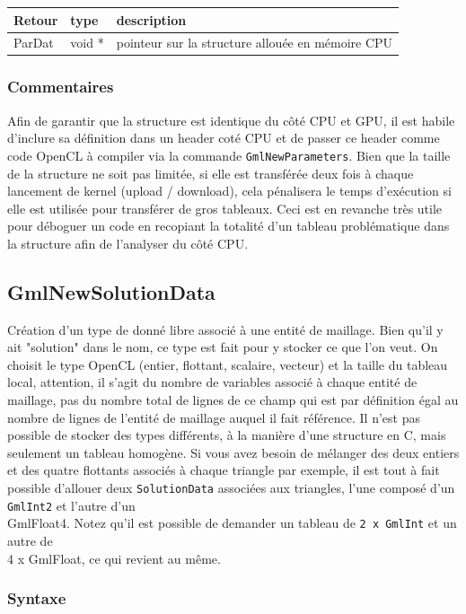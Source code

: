 \documentclass[a4paper,12pt]{article}
\begin{document}
\begin{tabular}{|m{2cm}|m{1.5cm}|m{10.5cm}|}
\hline
Retour     & type   & description \\
\hline
ParDat     & void * & pointeur sur la structure allouée en mémoire CPU \\
\hline
\end{tabular}

\subsubsection*{Commentaires}
Afin de garantir que la structure est identique du côté CPU et GPU, il est habile d'inclure sa définition dans un header coté CPU et de passer ce header comme code OpenCL à compiler via la commande {\tt GmlNewParameters}.
Bien que la taille de la structure ne soit pas limitée, si elle est transférée deux fois à chaque lancement de kernel (upload / download), cela pénalisera le temps d'exécution si elle est utilisée pour transférer de gros tableaux.
Ceci est en revanche très utile pour déboguer un code en recopiant la totalité d'un tableau problématique dans la structure afin de l'analyser du côté CPU.


\subsection{GmlNewSolutionData}

Création d'un type de donné libre associé à une entité de maillage.
Bien qu'il y ait "solution" dans le nom, ce type est fait pour y stocker ce que l'on veut.
On choisit le type OpenCL (entier, flottant, scalaire, vecteur) et la taille du tableau local, attention, il s'agit du nombre de variables associé à chaque entité de maillage, pas du nombre total de lignes de ce champ qui est par définition égal au nombre de lignes de l'entité de maillage auquel il fait référence.
Il n'est pas possible de stocker des types différents, à la manière d'une structure en C, mais seulement un tableau homogène. Si vous avez besoin de mélanger des deux entiers et des quatre flottants associés à chaque triangle par exemple, il est tout à fait possible d'allouer deux {\tt SolutionData} associées aux triangles, l'une composé d'un {\tt GmlInt2} et l'autre d'un {\\ GmlFloat4}. Notez qu'il est possible de demander un tableau de {\tt 2 x GmlInt} et un autre de {\\ 4 x GmlFloat}, ce qui revient au même.

\subsubsection*{Syntaxe}
\end{document}
